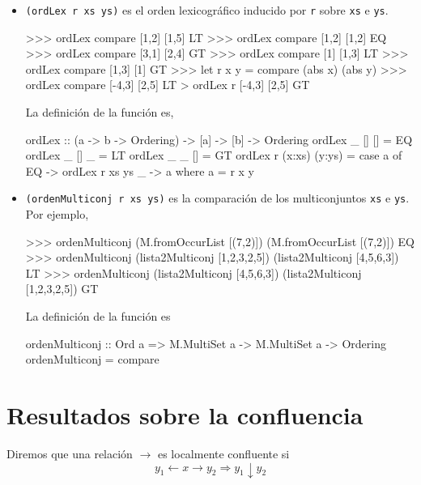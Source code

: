 \begin{itemize}
\item
{}
    \texttt{(ordLex r xs ys)} es el orden lexicográfico inducido por \texttt{r} sobre \texttt{xs} e \texttt{ys}. 
\begin{sesion}
>>> ordLex compare [1,2] [1,5]
LT
>>> ordLex compare [1,2] [1,2]
EQ
>>> ordLex compare [3,1] [2,4]
GT
>>> ordLex compare [1] [1,3]
LT
>>> ordLex compare [1,3] [1]
GT
>>> let r x y = compare (abs x) (abs y)
>>> ordLex compare [-4,3] [2,5]
LT
> ordLex r       [-4,3] [2,5]
GT
\end{sesion}
        
La definición de la función es,
       
\begin{codigo}
ordLex :: (a -> b -> Ordering) -> [a] -> [b] -> Ordering
ordLex _ [] []  = EQ
ordLex _ [] _   = LT
ordLex _ _  []  = GT
ordLex r (x:xs) (y:ys) = 
    case a of 
      EQ -> ordLex r xs ys
      _  -> a 
    where a = r x y
\end{codigo}      

\item {} \texttt{(ordenMulticonj r xs
    ys)} es la comparación de los multiconjuntos \texttt{xs} e
  \texttt{ys}. Por ejemplo,
\begin{sesion}
>>> ordenMulticonj (M.fromOccurList [(7,2)])  
  (M.fromOccurList [(7,2)])
EQ
>>> ordenMulticonj (lista2Multiconj [1,2,3,2,5]) 
  (lista2Multiconj [4,5,6,3])
LT
>>> ordenMulticonj (lista2Multiconj [4,5,6,3]) 
  (lista2Multiconj [1,2,3,2,5])
GT
\end{sesion}
        
La definición de la función es
        
\begin{codigo}
ordenMulticonj :: Ord a => M.MultiSet a -> M.MultiSet a 
                  -> Ordering
ordenMulticonj = compare
\end{codigo}

\end{itemize}

\section{Resultados sobre la confluencia}

\begin{defi} 
  Diremos que una relación $\rightarrow$ es localmente confluente si
  \[
    y_1 \leftarrow x \rightarrow y_2 \Rightarrow y_1 \downarrow y_2
  \] 
\end{defi}      

